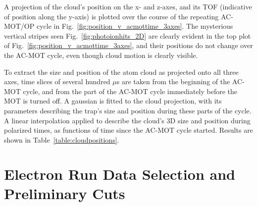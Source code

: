 A projection of the cloud's position on the x- and z-axes, and its TOF (indicative of position along the y-axis) is plotted over the course of the repeating AC-MOT/OP cycle in Fig.~\ref{fig:position_v_acmottime_3axes}. The mysterious vertical stripes seen Fig.~\ref{fig:photoionhits_2D} are clearly evident in the top plot of Fig.~\ref{fig:position_v_acmottime_3axes}, and their positions do not change over the AC-MOT cycle, even though cloud motion is clearly visible.  
 
To extract the size and position of the atom cloud as projected onto all three axes, time slices of several hundred $\mu$s are taken from the beginning of the AC-MOT cycle, and from the part of the AC-MOT cycle immediately before the MOT is turned off.  A gaussian is fitted to the cloud projection, with its parameters describing the trap's size and position during these parts of the cycle.  A linear interpolation applied to describe the cloud's 3D size and position during polarized times, as functions of time since the AC-MOT cycle started.  Results are shown in Table~\ref{table:cloudpositions}.


\FloatBarrier %



\FloatBarrier
\section{Electron Run Data Selection and Preliminary Cuts}
\label{sec:preliminary_cuts}

